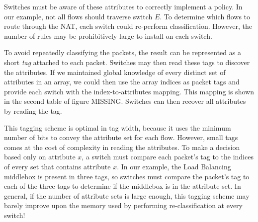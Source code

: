 Switches must be aware of these attributes to correctly implement a policy. In our example, not all flows should traverse switch $E$. To determine which flows to route through the NAT, each switch could re-perform classification. However, the number of rules may be prohibitively large to install on each switch.  

To avoid repeatedly classifying the packets, the result can be represented as a short \textit{tag} attached
to each packet. Switches may then read these tags to discover the attributes. If we maintained global knowledge of every distinct set of attributes in an array, we could then use the array indices as packet tags and provide each switch with the index-to-attributes mapping. This mapping is shown in the second table of figure MISSING. Switches can then recover all attributes by reading the tag.


This tagging scheme is optimal in tag width, because it uses the minimum number of bits to convey the attribute set for each flow. However, small tags comes at the cost of complexity in reading the attributes.  To make a decision based only on attribute $x$, a switch must compare each packet's tag to the indices of every set that contains attribute $x$. In our example, the Load Balancing middlebox is present in three tags, so switches must compare the packet's tag to each of the three tags to determine if the middlebox is in the attribute set. In general, if the number of attribute sets is large enough, this tagging scheme may barely improve upon the memory used by performing re-classification at every switch!







